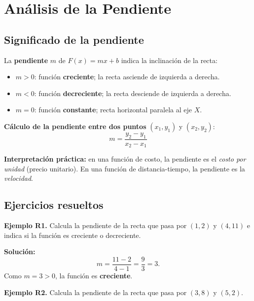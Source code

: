 \documentclass[12pt, letterpaper]{article}
\begin{document}
\section{Análisis de la Pendiente}

\subsection{Significado de la pendiente}

\begin{cuadroteoria}
  La \textbf{pendiente} $m$ de $F(x) = mx + b$ indica la inclinación de la recta:
  \begin{itemize}[leftmargin=*]
    \item $m > 0$: función \textbf{creciente}; la recta asciende de izquierda a derecha.
    \item $m < 0$: función \textbf{decreciente}; la recta desciende de izquierda a derecha.
    \item $m = 0$: función \textbf{constante}; recta horizontal paralela al eje $X$.
  \end{itemize}

  \textbf{Cálculo de la pendiente entre dos puntos} $(x_1, y_1)$ y $(x_2, y_2)$:
  $$m = \frac{y_2 - y_1}{x_2 - x_1}$$
\end{cuadroteoria}

\begin{cuadroextra}
  \textbf{Interpretación práctica:} en una función de costo, la pendiente es el \emph{costo por unidad} (precio unitario). En una función de distancia-tiempo, la pendiente es la \emph{velocidad}.
\end{cuadroextra}

\subsection{Ejercicios resueltos}

\textbf{Ejemplo R1.} Calcula la pendiente de la recta que pasa por $(1, 2)$ y $(4, 11)$ e indica si la función es creciente o decreciente.

\begin{cuadrosolucion}
  \textbf{Solución:}
  $$m = \frac{11 - 2}{4 - 1} = \frac{9}{3} = 3.$$
  Como $m = 3 > 0$, la función es \textbf{creciente}.
\end{cuadrosolucion}

\textbf{Ejemplo R2.} Calcula la pendiente de la recta que pasa por $(3, 8)$ y $(5, 2)$.
\end{document}

